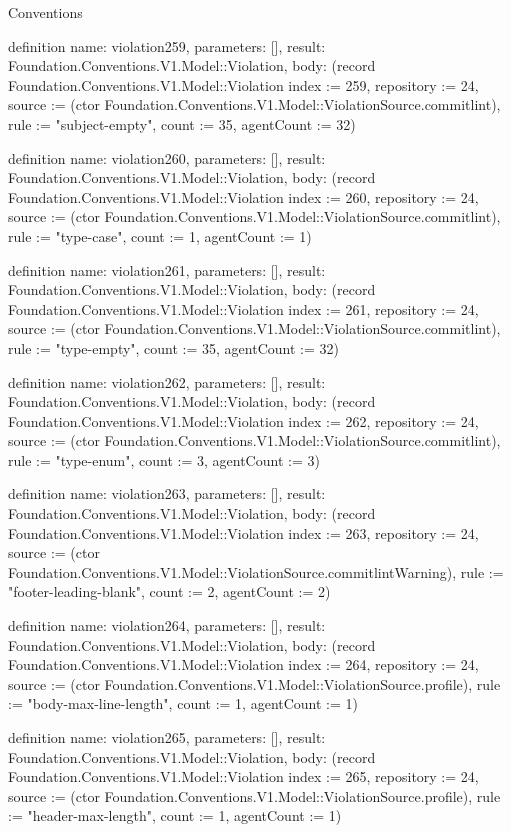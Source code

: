 \begin{lexlean}{Conventions}
\begin{semanticmodule}
definition{
  name: violation259,
  parameters: [],
  result: Foundation.Conventions.V1.Model::Violation,
  body: (record Foundation.Conventions.V1.Model::Violation {index := 259, repository := 24, source := (ctor Foundation.Conventions.V1.Model::ViolationSource.commitlint), rule := "subject-empty", count := 35, agentCount := 32})
}

definition{
  name: violation260,
  parameters: [],
  result: Foundation.Conventions.V1.Model::Violation,
  body: (record Foundation.Conventions.V1.Model::Violation {index := 260, repository := 24, source := (ctor Foundation.Conventions.V1.Model::ViolationSource.commitlint), rule := "type-case", count := 1, agentCount := 1})
}

definition{
  name: violation261,
  parameters: [],
  result: Foundation.Conventions.V1.Model::Violation,
  body: (record Foundation.Conventions.V1.Model::Violation {index := 261, repository := 24, source := (ctor Foundation.Conventions.V1.Model::ViolationSource.commitlint), rule := "type-empty", count := 35, agentCount := 32})
}

definition{
  name: violation262,
  parameters: [],
  result: Foundation.Conventions.V1.Model::Violation,
  body: (record Foundation.Conventions.V1.Model::Violation {index := 262, repository := 24, source := (ctor Foundation.Conventions.V1.Model::ViolationSource.commitlint), rule := "type-enum", count := 3, agentCount := 3})
}

definition{
  name: violation263,
  parameters: [],
  result: Foundation.Conventions.V1.Model::Violation,
  body: (record Foundation.Conventions.V1.Model::Violation {index := 263, repository := 24, source := (ctor Foundation.Conventions.V1.Model::ViolationSource.commitlintWarning), rule := "footer-leading-blank", count := 2, agentCount := 2})
}

definition{
  name: violation264,
  parameters: [],
  result: Foundation.Conventions.V1.Model::Violation,
  body: (record Foundation.Conventions.V1.Model::Violation {index := 264, repository := 24, source := (ctor Foundation.Conventions.V1.Model::ViolationSource.profile), rule := "body-max-line-length", count := 1, agentCount := 1})
}

definition{
  name: violation265,
  parameters: [],
  result: Foundation.Conventions.V1.Model::Violation,
  body: (record Foundation.Conventions.V1.Model::Violation {index := 265, repository := 24, source := (ctor Foundation.Conventions.V1.Model::ViolationSource.profile), rule := "header-max-length", count := 1, agentCount := 1})
}


\end{semanticmodule}
\end{lexlean}
